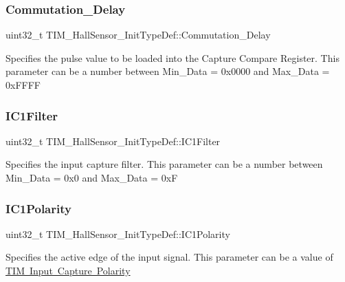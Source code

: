 \subsubsection{\texorpdfstring{Commutation\_Delay}{Commutation\_Delay}}
{\footnotesize\ttfamily uint32\+\_\+t T\+I\+M\+\_\+\+Hall\+Sensor\+\_\+\+Init\+Type\+Def\+::\+Commutation\+\_\+\+Delay}

Specifies the pulse value to be loaded into the Capture Compare Register. This parameter can be a number between Min\+\_\+\+Data = 0x0000 and Max\+\_\+\+Data = 0x\+F\+F\+FF \mbox{\label{struct_t_i_m___hall_sensor___init_type_def_a2d349ca17282be59dd09dc9b10948d24}} 
\subsubsection{\texorpdfstring{IC1Filter}{IC1Filter}}
{\footnotesize\ttfamily uint32\+\_\+t T\+I\+M\+\_\+\+Hall\+Sensor\+\_\+\+Init\+Type\+Def\+::\+I\+C1\+Filter}

Specifies the input capture filter. This parameter can be a number between Min\+\_\+\+Data = 0x0 and Max\+\_\+\+Data = 0xF \mbox{\label{struct_t_i_m___hall_sensor___init_type_def_a08e8f098cb51159344135bab57d82d85}} 
\subsubsection{\texorpdfstring{IC1Polarity}{IC1Polarity}}
{\footnotesize\ttfamily uint32\+\_\+t T\+I\+M\+\_\+\+Hall\+Sensor\+\_\+\+Init\+Type\+Def\+::\+I\+C1\+Polarity}

Specifies the active edge of the input signal. This parameter can be a value of \mbox{\hyperlink{group___t_i_m___input___capture___polarity}{T\+IM Input Capture Polarity}} \mbox{\label{struct_t_i_m___hall_sensor___init_type_def_ac6c54e891cbe5afec92676219978209e}} 
